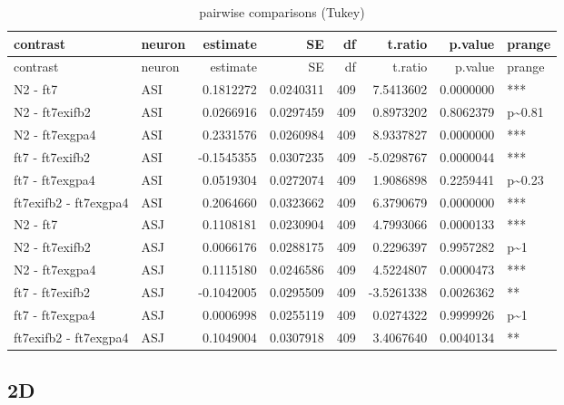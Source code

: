 \documentclass[]{article}
\begin{document}
\begin{longtable}[]{@{}llrrrrrl@{}}
\caption{pairwise comparisons (Tukey)}\tabularnewline
\toprule
contrast & neuron & estimate & SE & df & t.ratio & p.value &
prange\tabularnewline
\midrule
\endfirsthead
\toprule
contrast & neuron & estimate & SE & df & t.ratio & p.value &
prange\tabularnewline
\midrule
\endhead
N2 - ft7 & ASI & 0.1812272 & 0.0240311 & 409 & 7.5413602 & 0.0000000 &
***\tabularnewline
N2 - ft7exifb2 & ASI & 0.0266916 & 0.0297459 & 409 & 0.8973202 &
0.8062379 & p\textasciitilde{}0.81\tabularnewline
N2 - ft7exgpa4 & ASI & 0.2331576 & 0.0260984 & 409 & 8.9337827 &
0.0000000 & ***\tabularnewline
ft7 - ft7exifb2 & ASI & -0.1545355 & 0.0307235 & 409 & -5.0298767 &
0.0000044 & ***\tabularnewline
ft7 - ft7exgpa4 & ASI & 0.0519304 & 0.0272074 & 409 & 1.9086898 &
0.2259441 & p\textasciitilde{}0.23\tabularnewline
ft7exifb2 - ft7exgpa4 & ASI & 0.2064660 & 0.0323662 & 409 & 6.3790679 &
0.0000000 & ***\tabularnewline
N2 - ft7 & ASJ & 0.1108181 & 0.0230904 & 409 & 4.7993066 & 0.0000133 &
***\tabularnewline
N2 - ft7exifb2 & ASJ & 0.0066176 & 0.0288175 & 409 & 0.2296397 &
0.9957282 & p\textasciitilde{}1\tabularnewline
N2 - ft7exgpa4 & ASJ & 0.1115180 & 0.0246586 & 409 & 4.5224807 &
0.0000473 & ***\tabularnewline
ft7 - ft7exifb2 & ASJ & -0.1042005 & 0.0295509 & 409 & -3.5261338 &
0.0026362 & **\tabularnewline
ft7 - ft7exgpa4 & ASJ & 0.0006998 & 0.0255119 & 409 & 0.0274322 &
0.9999926 & p\textasciitilde{}1\tabularnewline
ft7exifb2 - ft7exgpa4 & ASJ & 0.1049004 & 0.0307918 & 409 & 3.4067640 &
0.0040134 & **\tabularnewline
\bottomrule
\end{longtable}

\subsection{2D}\label{d}
\end{document}
